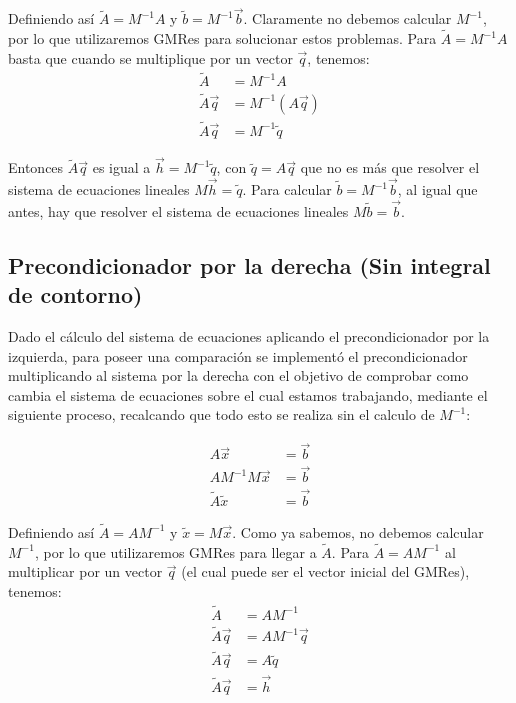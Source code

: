 \documentclass[fleqn]{article}
\begin{document}
Definiendo así $\widetilde{A} = M^{-1}A$ y $\widetilde{b} = M^{-1}\vec{b}$. Claramente no debemos calcular $M^{-1}$, por lo que utilizaremos GMRes para solucionar estos problemas. Para $\widetilde{A} = M^{-1}A$ basta que cuando se multiplique por un vector $\vec{q}$, tenemos:
\begin{align*}
    \widetilde{A} &= M^{-1}A \\
    \widetilde{A}\vec{q} &= M^{-1}(A\vec{q}) \\
    \widetilde{A}\vec{q} &= M^{-1}\widetilde{q}
\end{align*}

Entonces $\widetilde{A}\vec{q}$ es igual a $\vec{h} = M^{-1}\widetilde{q}$, con $\widetilde{q} = A\vec{q}$ que no es más que resolver el sistema de ecuaciones lineales $M\vec{h} = \widetilde{q}$. Para calcular $\widetilde{b} = M^{-1}\vec{b}$, al igual que antes, hay que resolver el sistema de ecuaciones lineales $M\widetilde{b} = \vec{b}$.\newpage
 
\subsection{Precondicionador por la derecha (Sin integral de contorno)}

Dado el cálculo del sistema de ecuaciones aplicando el precondicionador por la izquierda, para poseer una comparación se implementó el precondicionador multiplicando al sistema por la derecha con el objetivo de comprobar como cambia el sistema de ecuaciones sobre el cual estamos trabajando, mediante el siguiente proceso, recalcando que todo esto se realiza sin el calculo de $M^{-1}$:

\begin{align*}
    A\vec{x} &= \vec{b} \\
    A M^{-1} M\vec{x} &= \vec{b} \\
    \widetilde{A}\widetilde{x} &= \vec{b}
\end{align*}

Definiendo así $\widetilde{A} = AM^{-1}$ y $\widetilde{x} = M\vec{x}$. Como ya sabemos, no debemos calcular $M^{-1}$, por lo que utilizaremos GMRes para llegar a $\widetilde{A}$. Para $\widetilde{A} = AM^{-1}$ al multiplicar por un vector $\vec{q}$ (el cual puede ser el vector inicial del GMRes), tenemos:
\begin{align*}
    \widetilde{A} &= AM^{-1} \\
    \widetilde{A}\vec{q} &= AM^{-1}\vec{q}\\
    \widetilde{A}\vec{q} &= A\widetilde{q}\\
    \widetilde{A}\vec{q} &= \vec{h}
\end{align*}
\end{document}
